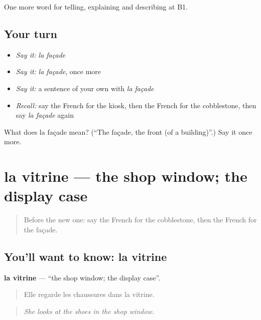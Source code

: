 \begin{grammarlens}[title={What you've built}]
One more word for telling, explaining and describing at B1.
\end{grammarlens}

\subsection*{Your turn}
\begin{itemize}
\raggedright
  \item \emph{Say it:} \emph{la façade}
  \item \emph{Say it:} \emph{la façade}, once more
  \item \emph{Say it:} a sentence of your own with \emph{la façade}
  \item \emph{Recall:} say the French for the kiosk, then the French for the cobblestone, then say \emph{la façade} again
\end{itemize}

\begin{tcolorbox}[breakable,colback=teal!4,colframe=teal!35!black,title={Before you move on}]
What does la façade mean? (\textquotedblleft{}The façade, the front (of a building)\textquotedblright{}.) Say it once more.
\end{tcolorbox}
\section[la vitrine]{la vitrine — the shop window; the display case}

\label{lesson:FR-C442-vitrine}



\begin{quote}
Before the new one: say the French for the cobblestone, then the French for the façade.
\end{quote}

\subsection*{You'll want to know: la vitrine}
\textbf{la vitrine} — \textquotedblleft{}the shop window; the display case\textquotedblright{}.

\begin{quote}
Elle regarde les chaussures dans la vitrine.
\end{quote}

\begin{quote}
\emph{She looks at the shoes in the shop window.}
\end{quote}

